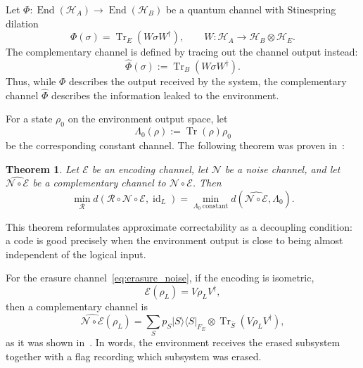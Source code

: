 \documentclass[10pt,twocolumn,superscriptaddress,aps,amsmath,amssymb,citeautoscript,floatfix,prx,longbibliography]{revtex4-2}
\newtheorem{theorem}{Theorem}
\theoremstyle{plain}
\theoremstyle{plain}
\theoremstyle{plain}
\theoremstyle{plain}
\theoremstyle{plain}
\theoremstyle{plain}
\begin{document}
Let \(\Phi:\operatorname{End}(\mathcal H_A)\to \operatorname{End}(\mathcal H_B)\) be a quantum channel with Stinespring dilation
\[
    \Phi(\sigma)=\operatorname{Tr}_E(W\sigma W^\dagger),
    \qquad
    W:\mathcal H_A\to \mathcal H_B\otimes \mathcal H_E .
\]
The complementary channel is defined by tracing out the channel output instead:
\[
    \widehat{\Phi}(\sigma)
    :=
    \operatorname{Tr}_B(W\sigma W^\dagger).
\]
Thus, while \(\Phi\) describes the output received by the system, the complementary channel \(\widehat{\Phi}\) describes the information leaked to the environment.

For a state \(\rho_0\) on the environment output space, let
\begin{equation}\label{eq:constant_channel_def}
    \Lambda_0(\rho):=\operatorname{Tr}(\rho)\rho_0
\end{equation}
be the corresponding constant channel. The following theorem was proven in~\cite{Beny2010}:

\begin{theorem}
\label{thm:beny}
Let \(\mathcal E\) be an encoding channel, let \(\mathcal N\) be a noise channel, and let \(\widehat{\mathcal N\circ\mathcal E}\) be a complementary channel to \(\mathcal N\circ\mathcal E\). Then
\begin{equation}\label{eq:beny}
    \min_{\mathcal R}
    d\!\left(
        \mathcal R\circ\mathcal N\circ\mathcal E,
        \operatorname{id}_L
    \right)
    =
    \min_{\Lambda_0\ \mathrm{constant}}
    d\!\left(
        \widehat{\mathcal N\circ\mathcal E},
        \Lambda_0
    \right).
\end{equation}
\end{theorem}

This theorem reformulates approximate correctability as a decoupling condition: a code is good precisely when the environment output is close to being almost independent of the logical input.

For the erasure channel~\eqref{eq:erasure_noise}, if the encoding is isometric,
\begin{equation}\label{eq:enc_isom}
    \mathcal E(\rho_L)=V\rho_LV^\dagger,
\end{equation}
then a complementary channel is
\begin{equation}\label{eq:dual_to_erasure}
    \widehat{\mathcal N\circ\mathcal E}(\rho_L)
    =
    \sum_S p_S
    |S\rangle\langle S|_{F_E}
    \otimes
    \operatorname{Tr}_{\bar S}
    \left(
        V\rho_LV^\dagger
    \right),
\end{equation}
as it was shown in~\cite{Faist2020}. In words, the environment receives the erased subsystem together with a flag
recording which subsystem was erased.
\end{document}
